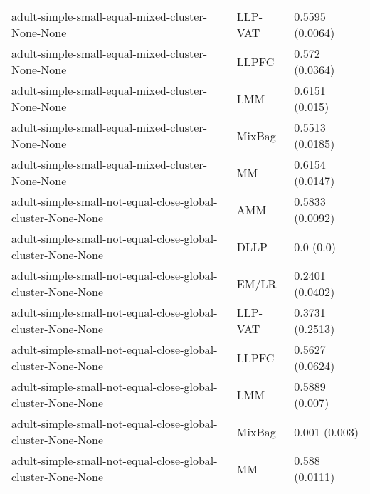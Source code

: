 \begin{longtable}{lll}
                                                             adult-simple-small-equal-mixed-cluster-None-None &   LLP-VAT &                       0.5595 (0.0064) \\
                                                             adult-simple-small-equal-mixed-cluster-None-None &     LLPFC &                        0.572 (0.0364) \\
                                                             adult-simple-small-equal-mixed-cluster-None-None &       LMM &                        0.6151 (0.015) \\
                                                             adult-simple-small-equal-mixed-cluster-None-None &    MixBag &                       0.5513 (0.0185) \\
                                                             adult-simple-small-equal-mixed-cluster-None-None &        MM &                       0.6154 (0.0147) \\
                                                  adult-simple-small-not-equal-close-global-cluster-None-None &       AMM &                       0.5833 (0.0092) \\
                                                  adult-simple-small-not-equal-close-global-cluster-None-None &      DLLP &                             0.0 (0.0) \\
                                                  adult-simple-small-not-equal-close-global-cluster-None-None &     EM/LR &                       0.2401 (0.0402) \\
                                                  adult-simple-small-not-equal-close-global-cluster-None-None &   LLP-VAT &                       0.3731 (0.2513) \\
                                                  adult-simple-small-not-equal-close-global-cluster-None-None &     LLPFC &                       0.5627 (0.0624) \\
                                                  adult-simple-small-not-equal-close-global-cluster-None-None &       LMM &                        0.5889 (0.007) \\
                                                  adult-simple-small-not-equal-close-global-cluster-None-None &    MixBag &                         0.001 (0.003) \\
                                                  adult-simple-small-not-equal-close-global-cluster-None-None &        MM &                        0.588 (0.0111) \\

\end{longtable}
